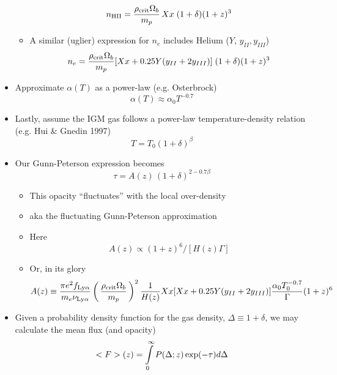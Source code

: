 \documentclass[12pt,letterpaper]{article}
\begin{document}
\begin{Aenumerate}
\begin{itemize}
\begin{itemize}
		\begin{equation}
		n_{\rm HII} = \frac{\rho_{\rm crit} \Omega_b}{m_p} \, X x \; (1+\delta) (1+z)^3
		\end{equation}
		\item A similar (uglier) expression for $n_e$ includes Helium ($Y$, $y_{II}, y_{III}$)
		\begin{equation}
		n_e = \frac{\rho_{\rm crit} \Omega_b}{m_p} [Xx + 0.25Y(y_{II} + 2y_{III})] \; (1+\delta) (1+z)^3
		\end{equation}
		\end{itemize}
	\item Approximate $\alpha(T)$ as a power-law (e.g. Osterbrock)
	\begin{equation}
	\alpha(T) \approx \alpha_0 T^{-0.7}
	\end{equation}
	\item Lastly, assume the IGM gas follows a power-law temperature-density
	relation (e.g. Hui \& Gnedin 1997)
	\begin{equation}
	T = T_0 (1+\delta)^\beta
	\label{eqn:rhoT}
	\end{equation}
	\item Our Gunn-Peterson expression becomes
	\begin{equation}
	\tau = A(z) \, (1+\delta)^{2 - 0.7 \beta}
	\end{equation}
		\begin{itemize}
		\item This opacity ``fluctuates'' with the local over-density
		\item aka the fluctuating Gunn-Peterson approximation
		\item Here
		\begin{equation}
		A(z) \propto (1+z)^6 / [H(z) \Gamma]
		\end{equation}
		\item Or, in its glory
		\begin{equation}
		A(z) \equiv \frac{\pi e^2 f_{\rm Ly\alpha}}{m_e \nu_{\rm Ly\alpha}}
		\left ( \, \frac{\rho_{\rm crit} \Omega_b}{m_p} \, \right )^2 
		\frac{1}{H(z)} Xx [Xx + 0.25Y(y_{II} + 2y_{III})] \frac{\alpha_0 T_0^{-0.7}}{\Gamma}
		(1+z)^6
		\end{equation}
		\end{itemize}
	\item Given a probability density function for the gas density,
	$\Delta \equiv 1 + \delta$, we may calculate the mean flux (and opacity)
	\begin{equation}
	<F>(z) = \intl_0^\infty P(\Delta; z) \exp(-\tau) d\Delta

\end{equation}
\end{itemize}
\end{Aenumerate}
\end{document}

